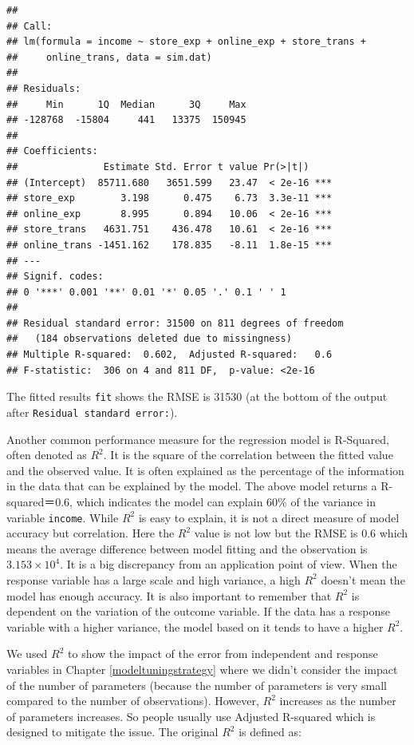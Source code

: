 \documentclass[12pt,]{krantz}
\begin{document}
\begin{verbatim}
## 
## Call:
## lm(formula = income ~ store_exp + online_exp + store_trans + 
##     online_trans, data = sim.dat)
## 
## Residuals:
##     Min      1Q  Median      3Q     Max 
## -128768  -15804     441   13375  150945 
## 
## Coefficients:
##               Estimate Std. Error t value Pr(>|t|)    
## (Intercept)  85711.680   3651.599   23.47  < 2e-16 ***
## store_exp        3.198      0.475    6.73  3.3e-11 ***
## online_exp       8.995      0.894   10.06  < 2e-16 ***
## store_trans   4631.751    436.478   10.61  < 2e-16 ***
## online_trans -1451.162    178.835   -8.11  1.8e-15 ***
## ---
## Signif. codes:  
## 0 '***' 0.001 '**' 0.01 '*' 0.05 '.' 0.1 ' ' 1
## 
## Residual standard error: 31500 on 811 degrees of freedom
##   (184 observations deleted due to missingness)
## Multiple R-squared:  0.602,	Adjusted R-squared:   0.6 
## F-statistic:  306 on 4 and 811 DF,  p-value: <2e-16
\end{verbatim}

The fitted results \texttt{fit} shows the RMSE is 31530 (at the bottom of the output after \texttt{Residual\ standard\ error:}).

Another common performance measure for the regression model is R-Squared, often denoted as \(R^2\). It is the square of the correlation between the fitted value and the observed value. It is often explained as the percentage of the information in the data that can be explained by the model. The above model returns a R-squared＝0.6, which indicates the model can explain 60\% of the variance in variable \texttt{income}. While \(R^2\) is easy to explain, it is not a direct measure of model accuracy but correlation. Here the \(R^2\) value is not low but the RMSE is 0.6 which means the average difference between model fitting and the observation is \ensuremath{3.153\times 10^{4}}. It is a big discrepancy from an application point of view. When the response variable has a large scale and high variance, a high \(R^2\) doesn't mean the model has enough accuracy. It is also important to remember that \(R^2\) is dependent on the variation of the outcome variable. If the data has a response variable with a higher variance, the model based on it tends to have a higher \(R^2\).

We used \(R^2\) to show the impact of the error from independent and response variables in Chapter \ref{modeltuningstrategy} where we didn't consider the impact of the number of parameters (because the number of parameters is very small compared to the number of observations). However, \(R^2\) increases as the number of parameters increases. So people usually use Adjusted R-squared which is designed to mitigate the issue. The original \(R^2\) is defined as:
\end{document}
